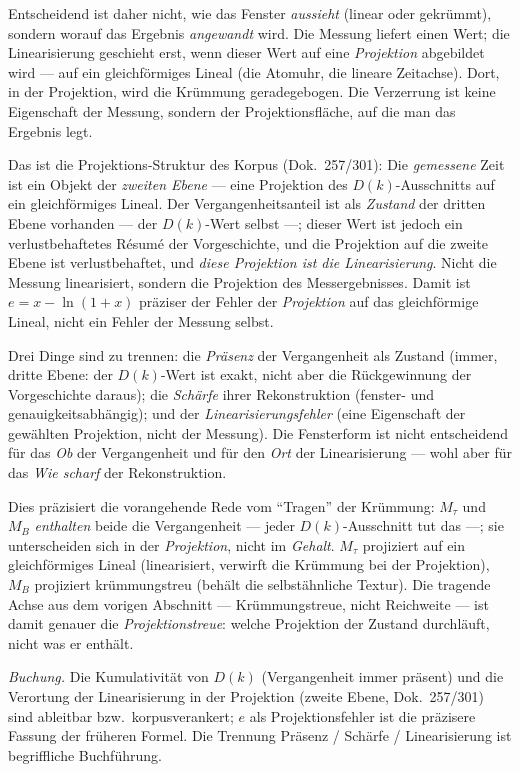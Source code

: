 Entscheidend ist daher nicht, wie das Fenster \emph{aussieht} (linear oder gekrümmt), sondern
worauf das Ergebnis \emph{angewandt} wird. Die Messung liefert einen Wert; die Linearisierung
geschieht erst, wenn dieser Wert auf eine \emph{Projektion} abgebildet wird --- auf ein
gleichförmiges Lineal (die Atomuhr, die lineare Zeitachse). Dort, in der Projektion, wird die
Krümmung geradegebogen. Die Verzerrung ist keine Eigenschaft der Messung, sondern der
Projektionsfläche, auf die man das Ergebnis legt.

Das ist die Projektions-Struktur des Korpus (Dok.~257/301): Die \emph{gemessene} Zeit ist ein
Objekt der \emph{zweiten Ebene} --- eine Projektion des $D(k)$-Ausschnitts auf ein
gleichförmiges Lineal. Der Vergangenheitsanteil ist als \emph{Zustand} der dritten Ebene vorhanden --- der
$D(k)$-Wert selbst ---; dieser Wert ist jedoch ein verlustbehaftetes Résumé der Vorgeschichte,
und die Projektion auf die zweite Ebene ist verlustbehaftet, und \emph{diese Projektion ist
die Linearisierung}. Nicht die Messung
linearisiert, sondern die Projektion des Messergebnisses. Damit ist $e = x-\ln(1+x)$
präziser der Fehler der \emph{Projektion} auf das gleichförmige Lineal, nicht ein Fehler der
Messung selbst.

Drei Dinge sind zu trennen: die \emph{Präsenz} der Vergangenheit als Zustand (immer, dritte Ebene: der $D(k)$-Wert
ist exakt, nicht aber die Rückgewinnung der Vorgeschichte daraus); die \emph{Schärfe} ihrer Rekonstruktion (fenster- und genauigkeitsabhängig); und der
\emph{Linearisierungsfehler} (eine Eigenschaft der gewählten Projektion, nicht der Messung).
Die Fensterform ist nicht entscheidend für das \emph{Ob} der Vergangenheit und für den
\emph{Ort} der Linearisierung --- wohl aber für das \emph{Wie scharf} der Rekonstruktion.

Dies präzisiert die vorangehende Rede vom \enquote{Tragen} der Krümmung: $M_\tau$ und $M_B$
\emph{enthalten} beide die Vergangenheit --- jeder $D(k)$-Ausschnitt tut das ---; sie
unterscheiden sich in der \emph{Projektion}, nicht im \emph{Gehalt}. $M_\tau$ projiziert auf
ein gleichförmiges Lineal (linearisiert, verwirft die Krümmung bei der Projektion), $M_B$
projiziert krümmungstreu (behält die selbstähnliche Textur). Die tragende Achse aus dem
vorigen Abschnitt --- Krümmungstreue, nicht Reichweite --- ist damit genauer die
\emph{Projektionstreue}: welche Projektion der Zustand durchläuft, nicht was er enthält.

\emph{Buchung.} Die Kumulativität von $D(k)$ (Vergangenheit immer präsent) und die Verortung
der Linearisierung in der Projektion (zweite Ebene, Dok.~257/301) sind ableitbar bzw.\
korpusverankert; $e$ als Projektionsfehler ist die präzisere Fassung der früheren Formel. Die
Trennung Präsenz / Schärfe / Linearisierung ist begriffliche Buchführung.

